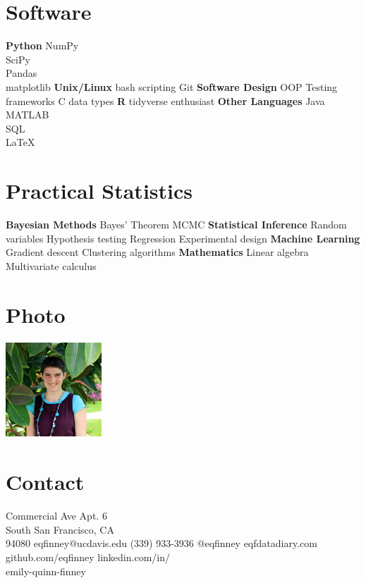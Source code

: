 \documentclass[]{cv-style}          %
\begin{document}
\begin{aside}
%
\section{Software}
\textbf{Python}
NumPy\\ SciPy\\ Pandas\\ matplotlib
\textbf{Unix/Linux}
bash scripting
Git
\textbf{Software Design}
OOP
Testing frameworks
C data types
\textbf{R}
tidyverse enthusiast
\textbf{Other Languages}
Java\\ MATLAB\\ SQL\\ \LaTeX
%
\section{Practical Statistics}
\textbf{Bayesian Methods}
Bayes' Theorem
MCMC
\textbf{Statistical Inference}
Random variables
Hypothesis testing
Regression
Experimental design
\textbf{Machine Learning}
Gradient descent
Clustering algorithms
\textbf{Mathematics}
Linear algebra
Multivariate calculus
%
\section{Photo}
\includegraphics[width=3.6cm,height=3.6cm]{headshot.jpg}
%
\section{Contact}
\fontsize{8}{10} Commercial Ave Apt. 6\\ South San Francisco, CA \\\hspace{0.5cm}94080
%
eqfinney@ucdavis.edu
%
(339) 933-3936
%
@eqfinney
%
eqfdatadiary.com
%
github.com/eqfinney
%
linkedin.com/in/\\\hspace{0.5cm}emily-quinn-finney
\end{aside}
\end{document}
